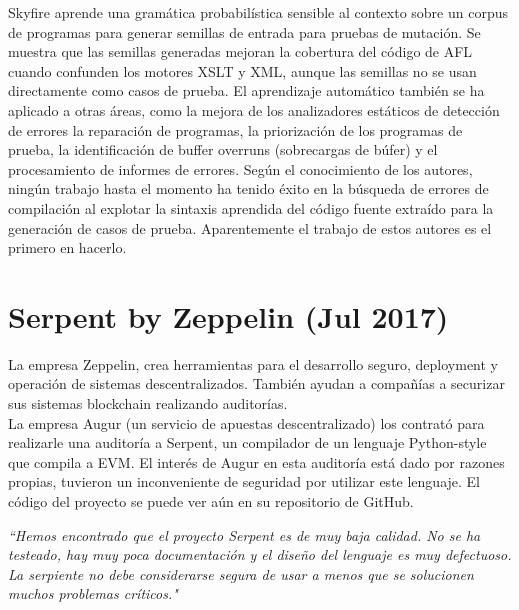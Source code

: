 Skyfire\cite{Wang:Chen:Wei:Liu:Skyfire} aprende una gramática probabilística sensible al contexto sobre un corpus de programas para generar semillas de entrada para pruebas de mutación. Se muestra que las semillas generadas mejoran la cobertura del código de AFL\cite{AFL} cuando confunden los motores XSLT y XML, aunque las semillas no se usan directamente como casos de prueba. El aprendizaje automático también se ha aplicado a otras áreas, como la mejora de los analizadores estáticos de detección de errores \cite{Heo:Oh:Yi:Unsound}\cite{Koc:Saadatpanah:Jeffrey:Porter:False} la reparación de programas\cite{Koukoutos:Raghothaman:Kneuss:Kuncak}\cite{White:Tufano:Martinez:Monperrus}, la priorización de los programas de prueba\cite{Chen:Bai:Hao:Xiong:Zhang}, la identificación de buffer overruns (sobrecargas de búfer)\cite{Choi:Jeong:Oh:Choo:BufferOverruns} y el procesamiento de informes de errores\cite{Xuan:Ming:Buggy}\cite{Lam:Anh:Nguyen:Nguyen:DeepLearning}. Según el conocimiento de los autores, ningún trabajo hasta el momento ha tenido éxito en la búsqueda de errores de compilación al explotar la sintaxis aprendida del código fuente extraído para la generación de casos de prueba. Aparentemente el trabajo de estos autores es el primero en hacerlo.

\section{Serpent by Zeppelin (Jul 2017)}

La empresa Zeppelin, crea herramientas para el desarrollo seguro, deployment y operación de sistemas descentralizados. También ayudan a compañías a securizar sus sistemas blockchain realizando auditorías.\\

La empresa Augur (un servicio de apuestas descentralizado) los contrató para realizarle una auditoría a Serpent, un compilador de un lenguaje Python-style que compila a EVM. El interés de Augur en esta auditoría está dado por razones propias, tuvieron un inconveniente de seguridad por utilizar este lenguaje. El código del proyecto se puede ver aún en su repositorio de GitHub\cite{SerpentRepository}.\\

\begin{displayquote}
    \textit{``Hemos encontrado que el proyecto Serpent es de muy baja calidad. No se ha testeado, hay muy poca documentación y el diseño del lenguaje es muy defectuoso. La serpiente no debe considerarse segura de usar a menos que se solucionen muchos problemas críticos."}
\end{displayquote}

